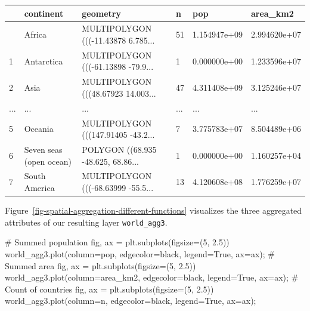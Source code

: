 \documentclass[
  letterpaper,
]{krantz}
\newenvironment{Shaded}{\begin{snugshade}}{\end{snugshade}}
\newcommand{\CommentTok}[1]{\textcolor[rgb]{0.37,0.37,0.37}{#1}}
\newcommand{\DecValTok}[1]{\textcolor[rgb]{0.68,0.00,0.00}{#1}}
\newcommand{\FloatTok}[1]{\textcolor[rgb]{0.68,0.00,0.00}{#1}}
\newcommand{\NormalTok}[1]{\textcolor[rgb]{0.00,0.23,0.31}{#1}}
\newcommand{\OperatorTok}[1]{\textcolor[rgb]{0.37,0.37,0.37}{#1}}
\newcommand{\StringTok}[1]{\textcolor[rgb]{0.13,0.47,0.30}{#1}}
\newcommand{\VariableTok}[1]{\textcolor[rgb]{0.07,0.07,0.07}{#1}}
\begin{document}
\begin{longtable}[]{@{}llllll@{}}
\toprule\noalign{}
& continent & geometry & n & pop & area\_km2 \\
\midrule\noalign{}
\endhead
\bottomrule\noalign{}
\endlastfoot
0 & Africa & MULTIPOLYGON (((-11.43878 6.785... & 51 & 1.154947e+09 &
2.994620e+07 \\
1 & Antarctica & MULTIPOLYGON (((-61.13898 -79.9... & 1 & 0.000000e+00 &
1.233596e+07 \\
2 & Asia & MULTIPOLYGON (((48.67923 14.003... & 47 & 4.311408e+09 &
3.125246e+07 \\
... & ... & ... & ... & ... & ... \\
5 & Oceania & MULTIPOLYGON (((147.91405 -43.2... & 7 & 3.775783e+07 &
8.504489e+06 \\
6 & Seven seas (open ocean) & POLYGON ((68.935 -48.625, 68.86... & 1 &
0.000000e+00 & 1.160257e+04 \\
7 & South America & MULTIPOLYGON (((-68.63999 -55.5... & 13 &
4.120608e+08 & 1.776259e+07 \\
\end{longtable}

Figure~\ref{fig-spatial-aggregation-different-functions} visualizes the
three aggregated attributes of our resulting layer \texttt{world\_agg3}.

\begin{Shaded}
\begin{Highlighting}[]
\CommentTok{\# Summed population}
\NormalTok{fig, ax }\OperatorTok{=}\NormalTok{ plt.subplots(figsize}\OperatorTok{=}\NormalTok{(}\DecValTok{5}\NormalTok{, }\FloatTok{2.5}\NormalTok{))}
\NormalTok{world\_agg3.plot(column}\OperatorTok{=}\StringTok{\textquotesingle{}pop\textquotesingle{}}\NormalTok{, edgecolor}\OperatorTok{=}\StringTok{\textquotesingle{}black\textquotesingle{}}\NormalTok{, legend}\OperatorTok{=}\VariableTok{True}\NormalTok{, ax}\OperatorTok{=}\NormalTok{ax)}\OperatorTok{;}
\CommentTok{\# Summed area}
\NormalTok{fig, ax }\OperatorTok{=}\NormalTok{ plt.subplots(figsize}\OperatorTok{=}\NormalTok{(}\DecValTok{5}\NormalTok{, }\FloatTok{2.5}\NormalTok{))}
\NormalTok{world\_agg3.plot(column}\OperatorTok{=}\StringTok{\textquotesingle{}area\_km2\textquotesingle{}}\NormalTok{, edgecolor}\OperatorTok{=}\StringTok{\textquotesingle{}black\textquotesingle{}}\NormalTok{, legend}\OperatorTok{=}\VariableTok{True}\NormalTok{, ax}\OperatorTok{=}\NormalTok{ax)}\OperatorTok{;}
\CommentTok{\# Count of countries}
\NormalTok{fig, ax }\OperatorTok{=}\NormalTok{ plt.subplots(figsize}\OperatorTok{=}\NormalTok{(}\DecValTok{5}\NormalTok{, }\FloatTok{2.5}\NormalTok{))}
\NormalTok{world\_agg3.plot(column}\OperatorTok{=}\StringTok{\textquotesingle{}n\textquotesingle{}}\NormalTok{, edgecolor}\OperatorTok{=}\StringTok{\textquotesingle{}black\textquotesingle{}}\NormalTok{, legend}\OperatorTok{=}\VariableTok{True}\NormalTok{, ax}\OperatorTok{=}\NormalTok{ax)}\OperatorTok{;}
\end{Highlighting}
\end{Shaded}
\end{document}

